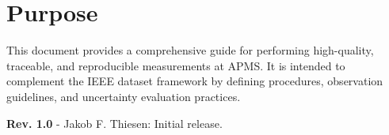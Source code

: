 \section{Purpose}
This document provides a comprehensive guide for performing high-quality, traceable, and reproducible measurements at APMS. It is intended to complement the IEEE dataset framework by defining procedures, observation guidelines, and uncertainty evaluation practices.


\vspace{1cm}
\textbf{Rev. 1.0} - Jakob F. Thiesen: Initial release.